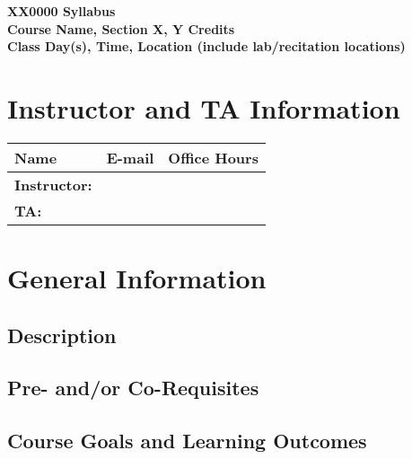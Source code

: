 \documentclass[10pt]{article}
\begin{document}
%
\begin{center}
{\bfseries \Large XX0000 Syllabus}\\
{\bfseries \large Course Name, Section X, Y Credits\\
Class Day(s), Time, Location (include lab/recitation locations)}
\end{center}

\section*{Instructor and TA Information}
\begin{tabular}[h] {l l l}
{\bfseries Name} & {\bfseries E-mail} & {\bfseries Office Hours}\\ \hline
{\bfseries Instructor:} & & \\ %
{\bfseries TA:} & & %
\end{tabular}

\section{General Information}
\subsection*{Description}
%
\subsection*{Pre- and/or Co-Requisites}
%
\subsection*{Course Goals and Learning Outcomes}
\end{document}
